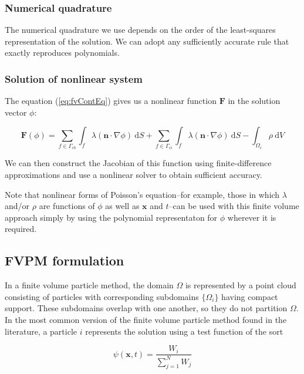 \documentclass[12pt]{article}
\newcommand{\refEq}[1]{(\ref{eq:#1})}
\renewcommand{\vec}[1]{\mathbf{#1}}
\newcommand{\grad}[1]{\nabla#1}
\newcommand{\dV}{~\mathrm{d}V}
\newcommand{\dS}{~\mathrm{d}S}
\begin{document}
\subsubsection*{Numerical quadrature}

The numerical quadrature we use depends on the order of the least-squares representation of the solution. We can adopt any sufficiently
accurate rule that exactly reproduces polynomials.

\subsubsection*{Solution of nonlinear system}

The equation \refEq{fvContEq} gives us a nonlinear function $\vec{F}$ in the solution vector $\phi$:

\begin{equation}
\vec{F}(\phi) = \sum_{f \in \Gamma_{cb}}\int_f \lambda (\vec{n}\cdot\grad{\phi}) \dS + 
\sum_{f \in \Gamma_{ci}}\int_f \lambda (\vec{n}\cdot\grad{\phi}) \dS - \int_{\Omega_c} \rho \dV
\end{equation}

We can then construct the Jacobian of this function using finite-difference approximations and use a nonlinear solver 
to obtain sufficient accuracy.

Note that nonlinear forms of Poisson's equation--for example, those in which $\lambda$ and/or $\rho$ are functions of $\phi$ as well 
as $\vec{x}$ and $t$--can be used with this finite volume approach simply by using the polynomial representaton for $\phi$ wherever 
it is required.

\subsection{FVPM formulation}

In a finite volume particle method, the domain $\Omega$ is represented by a point cloud consisting of particles with corresponding 
subdomains $\{\Omega_i\}$ having compact support. These subdomains overlap with one another, so they do not partition $\Omega$.
In the most common version of the finite volume particle method found in the literature, a particle $i$ represents the solution using 
a test function of the sort

\begin{equation}
\psi(\vec{x}, t) = \frac{W_i}{\sum_{j=1}^N W_j}
\end{equation}
\end{document}

